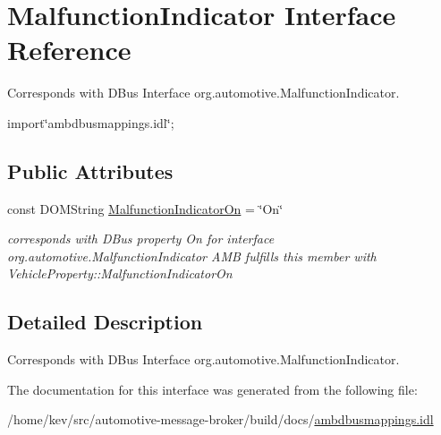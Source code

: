 \hypertarget{interfaceMalfunctionIndicator}{\section{Malfunction\+Indicator Interface Reference}
\label{interfaceMalfunctionIndicator}
}


Corresponds with D\+Bus Interface org.\+automotive.\+Malfunction\+Indicator.  




{\ttfamily import\char`\"{}ambdbusmappings.\+idl\char`\"{};}

\subsection*{Public Attributes}
\begin{DoxyCompactItemize}
\item 
\hypertarget{interfaceMalfunctionIndicator_a64d7768c2dfc5a36402bd7f6c57a1a31}{const D\+O\+M\+String \hyperlink{interfaceMalfunctionIndicator_a64d7768c2dfc5a36402bd7f6c57a1a31}{Malfunction\+Indicator\+On} = \char`\"{}On\char`\"{}}\label{interfaceMalfunctionIndicator_a64d7768c2dfc5a36402bd7f6c57a1a31}

\begin{DoxyCompactList}\small\item\em corresponds with D\+Bus property On for interface org.\+automotive.\+Malfunction\+Indicator A\+M\+B fulfills this member with Vehicle\+Property\+::\+Malfunction\+Indicator\+On \end{DoxyCompactList}\end{DoxyCompactItemize}


\subsection{Detailed Description}
Corresponds with D\+Bus Interface org.\+automotive.\+Malfunction\+Indicator. 

The documentation for this interface was generated from the following file\+:\begin{DoxyCompactItemize}
\item 
/home/kev/src/automotive-\/message-\/broker/build/docs/\hyperlink{ambdbusmappings_8idl}{ambdbusmappings.\+idl}\end{DoxyCompactItemize}
